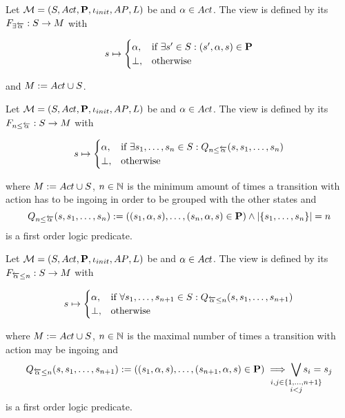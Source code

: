 \documentclass[preview]{standalone}
\begin{document}
\begin{definition}
	Let ${{{\mathcal{M}}}} = {{({S}, {Act}, {\textbf{P}}, {\iota_{init}}, {AP}, {L})}}$ be \chosengraphtypeN and ${\alpha} \in {Act}$. The view \viewhasinaction is defined by its \grpfctN ${{F_{\exists{\overleftarrow{\ensuremath{{\alpha}}}}}}} : {S} \to {\ensuremath{{M}}}$ with 
	
	\[
	{s} \mapsto
	\begin{cases}
		{\alpha},				& \text{if } \exists {s}' \in {S}: ({s}', {\alpha}, {s}) \in {\ensuremath{{\textbf{P}}}} \\
		{\bot},          	& \text{otherwise}
	\end{cases}
	\]
	
	and ${{M}} := {Act} \cup {\ensuremath{{S}}}$.	
	\label{def:mininaction}
\end{definition}	


\begin{definition}
	Let ${{{\mathcal{M}}}} = {{({S}, {Act}, {\textbf{P}}, {\iota_{init}}, {AP}, {L})}}$ be \chosengraphtypeN and ${\alpha} \in {Act}$. The view \viewmininaction is defined by its \grpfctN ${{F_{{n}\leq{\overleftarrow{\ensuremath{{\alpha}}}}}}} : {S} \to {M}$ with
	
	\[
	{s} \mapsto
	\begin{cases}
		{\alpha},				& \text{if } \exists {s}_1, \dots, {s}_{n} \in {S}:  {Q_{{n}\leq{\overleftarrow{\ensuremath{{\alpha}}}}}({s},{s}_1, \dots, {s}_{{n}})}\\
		{\bot},          	& \text{otherwise}
	\end{cases}
	\]
	
	where ${{M}} := {Act} \cup {\ensuremath{{S}}}$, ${n} \in {\mathbb{N}}$ is the minimum amount of times a transition with action \action has to be ingoing in order to be grouped with the other states and
	\[
	{Q_{{n}\leq{\overleftarrow{\ensuremath{{\alpha}}}}}({s},{s}_1, \dots, {s}_{{n}})} := (({s}_1, {\alpha}, {s}), \dots, ({s}_{n}, {\alpha}, {s}) \in {\ensuremath{{\textbf{P}}}}) \land |\{{s}_1, \dots, {s}_{n}\}| = {n}
	\]
	is a first order logic predicate.
	\label{def:viewmaxinaction}
\end{definition}

\begin{definition}
	Let ${{{\mathcal{M}}}} = {{({S}, {Act}, {\textbf{P}}, {\iota_{init}}, {AP}, {L})}}$ be \chosengraphtypeN and ${\alpha} \in {Act}$. The view \viewmaxinaction is defined by its \grpfctN ${{F_{{\overleftarrow{{\alpha}}}\leq{n}}}} : {S} \to {M}$ with
	
	\[
	{s} \mapsto
	\begin{cases}
		{\alpha},				& \text{if } \forall {s}_1, \dots, {s}_{{n}+1} \in {S}: {Q_{{\overleftarrow{{\alpha}}}\leq{n}}({s},{s}_1, \dots, {s}_{{n}+1})} \\
		{\bot},          	& \text{otherwise}
	\end{cases}
	\]
	
	where ${{M}} := {Act} \cup {\ensuremath{{S}}}$, ${n} \in {\mathbb{N}}$ is the maximal number of times a transition with action \action may be ingoing and 
	\[
	\predmaxinact := ((\state_1, \action, \state), \dots, (\state_{\numinact+1}, \action, \state) \in \trans) \implies \bigvee_{\mathclap{\substack{i,j \in \{1,\dots, \numinact+1\} \\ i < j}}} \state_i = \state_j
	\]
	is a first order logic predicate.
\end{definition}
\end{document}
